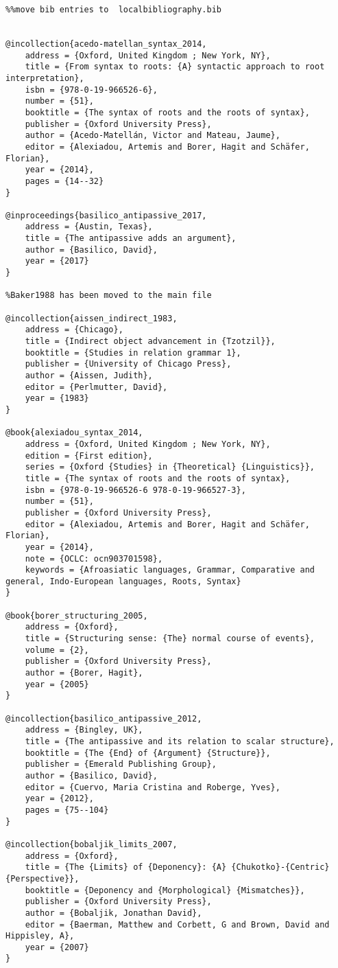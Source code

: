 \documentclass[output=paper,modfonts,nonflat]{langsci/langscibook}
\begin{document}
\begin{verbatim}%%move bib entries to  localbibliography.bib


@incollection{acedo-matellan_syntax_2014,
	address = {Oxford, United Kingdom ; New York, NY},
	title = {From syntax to roots: {A} syntactic approach to root interpretation},
	isbn = {978-0-19-966526-6},
	number = {51},
	booktitle = {The syntax of roots and the roots of syntax},
	publisher = {Oxford University Press},
	author = {Acedo-Matellán, Victor and Mateau, Jaume},
	editor = {Alexiadou, Artemis and Borer, Hagit and Schäfer, Florian},
	year = {2014},
	pages = {14--32}
}

@inproceedings{basilico_antipassive_2017,
	address = {Austin, Texas},
	title = {The antipassive adds an argument},
	author = {Basilico, David},
	year = {2017}
}

%Baker1988 has been moved to the main file

@incollection{aissen_indirect_1983,
	address = {Chicago},
	title = {Indirect object advancement in {Tzotzil}},
	booktitle = {Studies in relation grammar 1},
	publisher = {University of Chicago Press},
	author = {Aissen, Judith},
	editor = {Perlmutter, David},
	year = {1983}
}

@book{alexiadou_syntax_2014,
	address = {Oxford, United Kingdom ; New York, NY},
	edition = {First edition},
	series = {Oxford {Studies} in {Theoretical} {Linguistics}},
	title = {The syntax of roots and the roots of syntax},
	isbn = {978-0-19-966526-6 978-0-19-966527-3},
	number = {51},
	publisher = {Oxford University Press},
	editor = {Alexiadou, Artemis and Borer, Hagit and Schäfer, Florian},
	year = {2014},
	note = {OCLC: ocn903701598},
	keywords = {Afroasiatic languages, Grammar, Comparative and general, Indo-European languages, Roots, Syntax}
}

@book{borer_structuring_2005,
	address = {Oxford},
	title = {Structuring sense: {The} normal course of events},
	volume = {2},
	publisher = {Oxford University Press},
	author = {Borer, Hagit},
	year = {2005}
}

@incollection{basilico_antipassive_2012,
	address = {Bingley, UK},
	title = {The antipassive and its relation to scalar structure},
	booktitle = {The {End} of {Argument} {Structure}},
	publisher = {Emerald Publishing Group},
	author = {Basilico, David},
	editor = {Cuervo, Maria Cristina and Roberge, Yves},
	year = {2012},
	pages = {75--104}
}

@incollection{bobaljik_limits_2007,
	address = {Oxford},
	title = {The {Limits} of {Deponency}: {A} {Chukotko}-{Centric} {Perspective}},
	booktitle = {Deponency and {Morphological} {Mismatches}},
	publisher = {Oxford University Press},
	author = {Bobaljik, Jonathan David},
	editor = {Baerman, Matthew and Corbett, G and Brown, David and Hippisley, A},
	year = {2007}
}


\end{verbatim}
\end{document}
